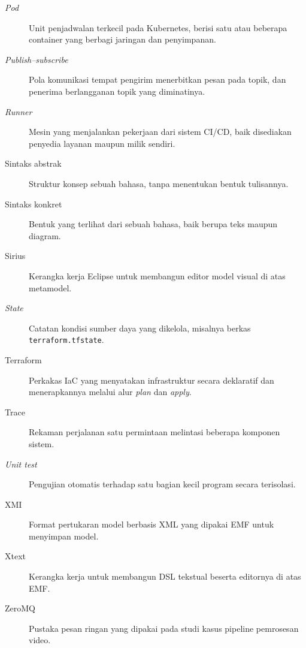 \begin{description}
  \item[\textit{Pod}] Unit penjadwalan terkecil pada Kubernetes, berisi satu atau beberapa container yang berbagi jaringan dan penyimpanan.
  \item[\textit{Publish--subscribe}] Pola komunikasi tempat pengirim menerbitkan pesan pada topik, dan penerima berlangganan topik yang diminatinya.
  \item[\textit{Runner}] Mesin yang menjalankan pekerjaan dari sistem CI/CD, baik disediakan penyedia layanan maupun milik sendiri.
  \item[Sintaks abstrak] Struktur konsep sebuah bahasa, tanpa menentukan bentuk tulisannya.
  \item[Sintaks konkret] Bentuk yang terlihat dari sebuah bahasa, baik berupa teks maupun diagram.
  \item[Sirius] Kerangka kerja Eclipse untuk membangun editor model visual di atas metamodel.
  \item[\textit{State}] Catatan kondisi sumber daya yang dikelola, misalnya berkas \texttt{terraform.tfstate}.
  \item[Terraform] Perkakas IaC yang menyatakan infrastruktur secara deklaratif dan menerapkannya melalui alur \textit{plan} dan \textit{apply}.
  \item[Trace] Rekaman perjalanan satu permintaan melintasi beberapa komponen sistem.
  \item[\textit{Unit test}] Pengujian otomatis terhadap satu bagian kecil program secara terisolasi.
  \item[XMI] Format pertukaran model berbasis XML yang dipakai EMF untuk menyimpan model.
  \item[Xtext] Kerangka kerja untuk membangun DSL tekstual beserta editornya di atas EMF.
  \item[ZeroMQ] Pustaka pesan ringan yang dipakai pada studi kasus pipeline pemrosesan video.
\end{description}

